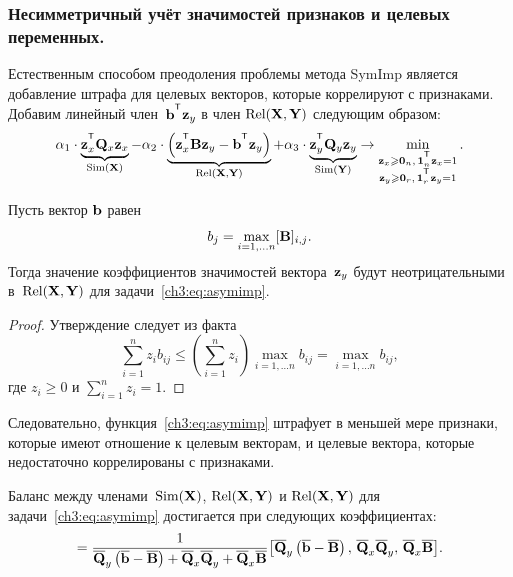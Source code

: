 \subsubsection{Несимметричный учёт значимостей признаков и целевых переменных.}
Естественным способом преодоления проблемы метода SymImp является добавление штрафа для целевых векторов, которые коррелируют с признаками.
Добавим линейный член~$\bb^{\T} \bz_y$ в член $\text{Rel}(\mathbf{X}, \mathbf{Y})$ следующим образом:
\begin{equation}
	\alpha_1 \cdot \underbrace{\bz_x^{\T} \bQ_x \bz_x}_{\text{Sim}(\bX)} - \alpha_2 \cdot  \underbrace{\left(\bz_x^{\T} \bB \bz_y - \bb^{\T} \bz_y \right) }_{\text{Rel}(\bX, \bY)} + \alpha_3 \cdot \underbrace{\bz_y^{\T} \bQ_y \bz_y}_{\text{Sim}(\bY)} \rightarrow \min_{\substack{\bz_x \geq \bZero_n, \, \bOne_n^{\T}\bz_x=1 \\ \bz_y \geq \bZero_r, \, \bOne_r^{\T}\bz_y=1}}.
	\label{ch3:eq:asymimp}
\end{equation}
\begin{statement}
	Пусть вектор $\mathbf{b}$ равен
	\begin{equation*}
	b_j = \max_{i=1, \dots n} [\mathbf{B}]_{i, j}.
	\end{equation*}
	Тогда значение коэффициентов значимостей вектора~$\mathbf{z}_y$ будут неотрицательными в~$\text{Rel}(\mathbf{X}, \mathbf{Y})$ для задачи~\eqref{ch3:eq:asymimp}.
\end{statement}
\begin{proof}
	Утверждение следует из факта
	\[
	\sum_{i=1}^n  z_i b_{ij} \leq \left(\sum_{i=1}^n z_i \right)\max_{i=1, \dots n} b_{ij} = \max_{i=1, \dots n} b_{ij},
	\]
	где $z_i \geq 0$ и $\sum_{i=1}^n z_i = 1$.
\end{proof}
Следовательно, функция~\eqref{ch3:eq:asymimp} штрафует в меньшей мере признаки, которые имеют отношение к целевым векторам, и целевые вектора, которые недостаточно коррелированы с признаками.
\begin{statement}
	Баланс между членами~$\text{Sim}(\mathbf{X})$, $\text{Rel}(\mathbf{X}, \mathbf{Y})$ и $\text{Rel}(\mathbf{X}, \mathbf{Y})$ для задачи~\eqref{ch3:eq:asymimp} достигается при следующих коэффициентах:
	\begin{equation*}
		[\alpha_1, \alpha_2, \alpha_3] = \frac{1}{\overline{\bQ}_y \left( \overline{\bb} - \overline{\bB}\right) + \overline{\bQ}_x \overline{\bQ}_y + \overline{\bQ}_x \overline{\bB}} \bigl [\overline{\bQ}_y \left( \overline{\bb} - \overline{\bB}\right), \, \overline{\bQ}_x \overline{\bQ}_y, \, \overline{\bQ}_x \overline{\bB}\bigr].
	\end{equation*}
\end{statement}
